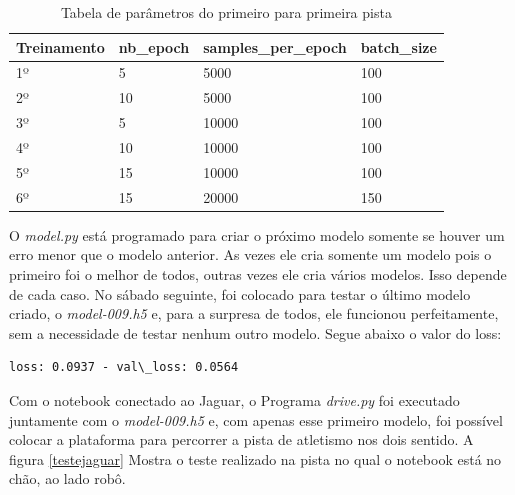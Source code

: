 \begin{table}[H]
\centering
\caption{ Tabela de parâmetros do primeiro para primeira pista}
\label{parametros1}
\begin{tabular}{|l|l|l|l|}
\hline
\textbf{Treinamento} & \textbf{nb\_epoch} & \textbf{samples\_per\_epoch} & \textbf{batch\_size} \\ \hline
1º        & 5         & 5000                & 100         \\ 
2º        & 10        & 5000                & 100         \\ 
3º        & 5         & 10000               & 100         \\ 
4º        & 10        & 10000               & 100         \\ 
5º        & 15        & 10000               & 100         \\ 
6º        & 15        & 20000               & 150         \\ \hline
\end{tabular}
\end{table}

O \textit{model.py} está programado para criar o próximo modelo somente se houver um erro menor que o modelo anterior. As vezes ele cria somente um modelo pois o primeiro foi o melhor de todos, outras vezes ele cria vários modelos. Isso depende de cada caso.
No sábado seguinte, foi colocado para testar o último modelo criado, o \textit{model-009.h5} e, para a surpresa de todos, ele funcionou perfeitamente, sem a necessidade de testar nenhum outro modelo. Segue abaixo o valor do loss:

\begin{lstlisting}
loss: 0.0937 - val\_loss: 0.0564
\end{lstlisting}

Com o notebook conectado ao Jaguar, o Programa \textit{drive.py} foi executado juntamente com o \textit{model-009.h5} e, com apenas esse primeiro modelo, foi possível colocar a plataforma para percorrer a pista de atletismo nos dois sentido. A figura \ref{testejaguar} Mostra o teste realizado na pista no qual o notebook está no chão, ao lado robô.

	\begin{figure}[H]
		\centering
\end{figure}



